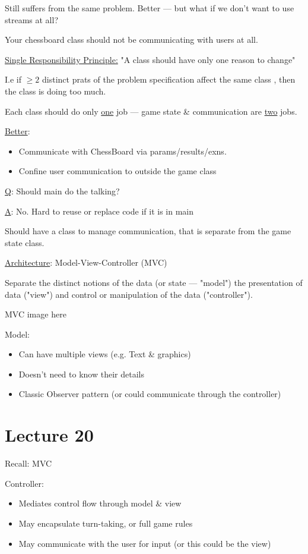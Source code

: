 \documentclass{article}
\begin{document}
Still suffers from the same problem. Better --- but what if we don't want to use streams at all? 

Your chessboard class should not be communicating with users at all. 

\underline{Single Responsibility Principle:} "A class should have only one reason to change"

I.e if $\geq 2$  distinct prats of the problem specification affect the same class , then the class is doing too much.

Each class should do only \underline{one} job --- game state \& communication are \underline{two} jobs.

\underline{Better}: 
\begin{itemize}
    \item Communicate with ChessBoard via params/results/exns.
    \item Confine user communication to outside the game class
\end{itemize}

\underline{Q}: Should main do the talking?

\underline{A}: No. Hard to reuse or replace code if it is in main

Should have a class to manage communication, that is separate from the game state class. 

\underline{Architecture}: Model-View-Controller (MVC)

Separate the distinct notions of the data (or state --- "model") the presentation of data ("view") and control or manipulation of the data ("controller").

MVC image here

Model:
\begin{itemize}
    \item Can have multiple views (e.g. Text \& graphics)
    \item Doesn't need to know their details
    \item Classic Observer pattern (or could communicate through the controller)
\end{itemize}


\section*{Lecture 20}

Recall: MVC

Controller:
\begin{itemize}
    \item Mediates control flow through model \& view
    \item May encapsulate turn-taking, or full game rules
    \item May communicate with the user for input (or this could be the view)
\end{itemize}
\end{document}
